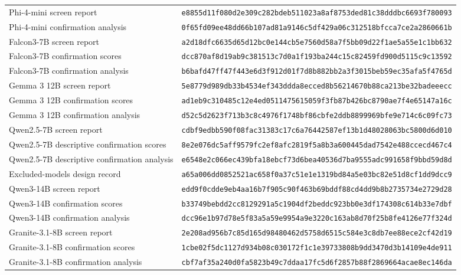 \documentclass[10pt]{article}
\newcommand{\lit}[1]{\texttt{#1}}
\begin{document}
\begin{table}[h!]
\begin{center}
\begin{tabular}{@{}ll@{}}
Phi-4-mini screen report & \lit{e8855d11f080d2e309c282bdeb511023a8af8753ded81c38dddbc6693f780093} \\
Phi-4-mini confirmation analysis & \lit{0f65fd09ee48dd66b107ad81a9146c5df429a06c312518bfcca7ce2a2860661b} \\
Falcon3-7B screen report & \lit{a2d18dfc6635d65d12bc0e144cb5e7560d58a7f5bb09d22f1ae5a55e1c1bb632} \\
Falcon3-7B confirmation scores & \lit{dcc870af8d19ab9c381513c7d0a1f193ba244c15c82459fd900d5115c9c13592} \\
Falcon3-7B confirmation analysis & \lit{b6bafd47ff47f443e6d3f912d01f7d8b882bb2a3f3015beb59ec35afa5f4765d} \\
Gemma 3 12B screen report & \lit{5e8779d989db33b4534ef343ddda8ecced8b56214670b88ca213be32badeeecc} \\
Gemma 3 12B confirmation scores & \lit{ad1eb9c310485c12e4ed0511475615059f3fb87b426bc8790ae7f4e65147a16c} \\
Gemma 3 12B confirmation analysis & \lit{d52c5d2623f713b3c8c4976f1748bf86cbfe2ddb8899969bfe9e714c6c09fc73} \\
Qwen2.5-7B screen report & \lit{cdbf9edbb590f08fac31383c17c6a76442587ef13b1d48028063bc5800d6d010} \\
Qwen2.5-7B descriptive confirmation scores & \lit{8e2e076dc5aff9579fc2ef8afc2819f5a8b3a600445dad7542e488ccecd467c4} \\
Qwen2.5-7B descriptive confirmation analysis & \lit{e6548e2c066ec439bfa18ebcf73d6bea40536d7ba9555adc991658f9bbd59d8d} \\
Excluded-models design record & \lit{a65a006dd0852521ac658f0a37c51e1e1319bd84a5e03bc82e51d8cf1dd9dcc9} \\
Qwen3-14B screen report & \lit{edd9f0cdde9eb4aa16b7f905c90f463b69bddf88cd4dd9b8b2735734e2729d28} \\
Qwen3-14B confirmation scores & \lit{b33749bebdd2cc8129291a5c1904df2beddc923bb0e3df174308c614b33e7dbf} \\
Qwen3-14B confirmation analysis & \lit{dcc96e1b97d78e5f83a5a59e9954a9e3220c163ab8d70f25b8fe4126e77f324d} \\
Granite-3.1-8B screen report & \lit{2e208ad956b7c85d165d98480462d5758d6515c584e3c8db7ee88ece2cf42d19} \\
Granite-3.1-8B confirmation scores & \lit{1cbe02f5dc1127d934b08c030172f1c1e39733808b9dd3470d3b14109e4de911} \\
Granite-3.1-8B confirmation analysis & \lit{cbf7af35a240d0fa5823b49c7ddaa17fc5d6f2857b88f2869664acae8ec146da} \\

\end{tabular}
\end{center}
\end{table}
\end{document}
